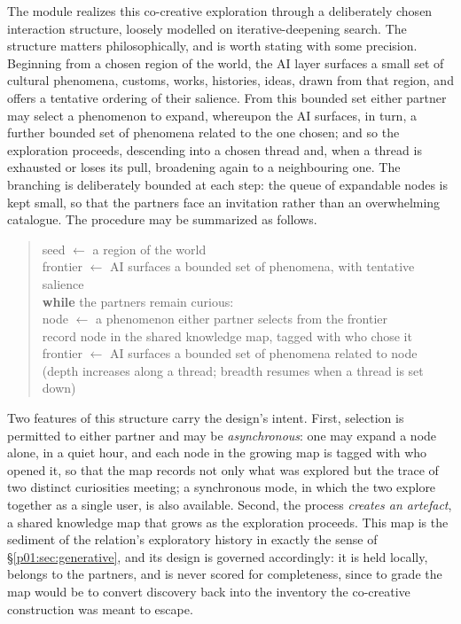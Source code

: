 \documentclass[11pt,a4paper]{article}
\begin{document}
The module realizes this co-creative exploration through a deliberately chosen interaction structure, loosely modelled on iterative-deepening search. The structure matters philosophically, and is worth stating with some precision. Beginning from a chosen region of the world, the AI layer surfaces a small set of cultural phenomena, customs, works, histories, ideas, drawn from that region, and offers a tentative ordering of their salience. From this bounded set either partner may select a phenomenon to expand, whereupon the AI surfaces, in turn, a further bounded set of phenomena related to the one chosen; and so the exploration proceeds, descending into a chosen thread and, when a thread is exhausted or loses its pull, broadening again to a neighbouring one. The branching is deliberately bounded at each step: the queue of expandable nodes is kept small, so that the partners face an invitation rather than an overwhelming catalogue. The procedure may be summarized as follows.

\begin{quote}\small\ttfamily
seed $\leftarrow$ a region of the world\\
frontier $\leftarrow$ AI surfaces a bounded set of phenomena, with tentative salience\\
\textbf{while} the partners remain curious:\\
\hspace*{1.5em}node $\leftarrow$ a phenomenon either partner selects from the frontier\\
\hspace*{1.5em}record node in the shared knowledge map, tagged with who chose it\\
\hspace*{1.5em}frontier $\leftarrow$ AI surfaces a bounded set of phenomena related to node\\
\hspace*{1.5em}(depth increases along a thread; breadth resumes when a thread is set down)
\end{quote}

\noindent Two features of this structure carry the design's intent. First, selection is permitted to either partner and may be \emph{asynchronous}: one may expand a node alone, in a quiet hour, and each node in the growing map is tagged with who opened it, so that the map records not only what was explored but the trace of two distinct curiosities meeting; a synchronous mode, in which the two explore together as a single user, is also available. Second, the process \emph{creates an artefact}, a shared knowledge map that grows as the exploration proceeds. This map is the sediment of the relation's exploratory history in exactly the sense of §\ref{p01:sec:generative}, and its design is governed accordingly: it is held locally, belongs to the partners, and is never scored for completeness, since to grade the map would be to convert discovery back into the inventory the co-creative construction was meant to escape.
\end{document}
